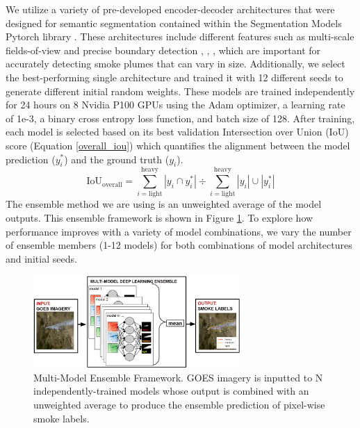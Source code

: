 \documentclass{article}
\begin{document}
We utilize a variety of pre-developed encoder-decoder architectures that were designed for semantic segmentation contained within the Segmentation Models Pytorch library \citep{semantic}. These architectures include different features such as multi-scale fields-of-view and precise boundary detection \citep{dlv3p}, \citep{PAN}, \citep{UNetpp}, which are important for accurately detecting smoke plumes that can vary in size. Additionally, we select the best-performing single architecture and trained it with 12 different seeds to generate different initial random weights. These models are trained independently for 24 hours on 8 Nvidia P100 GPUs using the Adam optimizer, a learning rate of 1e-3, a binary cross entropy loss function, and batch size of 128. After training, each model is selected based on its best validation Intersection over Union (IoU) score (Equation \ref{overall_iou}) which quantifies the alignment between the model prediction ($ y^*_{i} $) and the ground truth ($y_{i}$).
\begin{equation} \label{overall_iou}
    \text{IoU}_{\text{overall}} = {\sum\limits_{i=\text{light}}^{\text{heavy}}|y_{i}\cap y^*_{i}|} \div {\sum\limits_{i=\text{light}}^{\text{heavy}}|y_{i}|\cup|y^*_{i}|}
\end{equation}
The ensemble method we are using is an unweighted average of the model outputs\citep{nn-ensemble2}. This ensemble framework is shown in Figure \ref{fig:ensemble_framework}. To explore how performance improves with a variety of model combinations, we vary the number of ensemble members (1-12 models) for both combinations of model architectures and initial seeds.
\begin{figure}
    \centering
    \includegraphics[width=0.7\textwidth]{ensemble_framework.png}
    \caption{\RaggedRight Multi-Model Ensemble Framework. GOES imagery is inputted to N independently-trained models whose output is combined with an unweighted average to produce the ensemble prediction of pixel-wise smoke labels.}
    \label{fig:ensemble_framework}
\end{figure}
\end{document}
